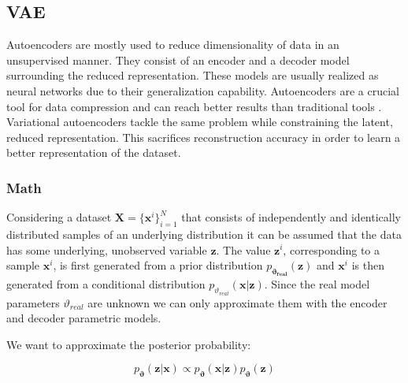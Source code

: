 \documentclass[11pt, english]{article}
\begin{document}
\subsection{VAE}

\vspace{5mm}

\par Autoencoders are mostly used to reduce dimensionality of data in an unsupervised manner. They consist of an encoder and a decoder model surrounding the reduced representation. These models are usually realized as neural networks due to their generalization capability. Autoencoders are a crucial tool for data compression and can reach better results than traditional tools \cite{theis2017lossy}. Variational autoencoders tackle the same problem while constraining the latent, reduced representation. This sacrifices reconstruction accuracy in order to learn a better representation of the dataset.

\subsubsection{Math}

\par Considering a dataset $\boldsymbol{X} = \big\{\boldsymbol{\bm{x}}^{i}\big\}_{i = 1}^{N}$ that consists of independently and identically distributed samples of an underlying distribution it can be assumed that the data has some underlying, unobserved variable $\boldsymbol{\bm{z}}$. The value $\boldsymbol{\bm{z}}^{i}$, corresponding to a sample $\boldsymbol{\bm{x}}^{i}$, is first generated from a prior distribution $p_{\boldsymbol{\vartheta_{real}}}(\boldsymbol{\bm{z}})$ and $\boldsymbol{\bm{x}}^{i}$ is then generated from a conditional distribution $p_{\vartheta_{real}}(\boldsymbol{\bm{x}} | \boldsymbol{\bm{z}})$. Since the real model parameters $\vartheta_{real}$ are unknown we can only approximate them with the encoder and decoder parametric models.
\par We want to approximate the posterior probability:

\vspace{3mm}

\begin{equation}
    p_{\boldsymbol{\vartheta}}(\boldsymbol{\bm{z}} | \boldsymbol{\bm{x}}) \propto p_{\boldsymbol{\vartheta}}(\boldsymbol{\bm{x}} | \boldsymbol{\bm{z}}) p_{\boldsymbol{\vartheta}}(\boldsymbol{\bm{z}})
\end{equation}
\end{document}
